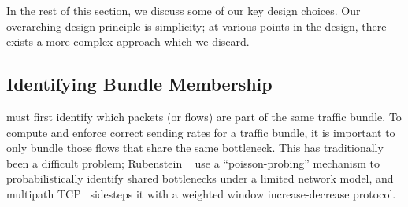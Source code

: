 

In the rest of this section, we discuss some of our key design choices.
Our overarching design principle is simplicity; at various points in the design, there exists a more complex approach which we discard.

\subsection{Identifying Bundle Membership}\label{s:design:membership}
\name must first identify which packets (or flows) are part of the same traffic bundle.
To compute and enforce correct sending rates for a traffic bundle, it is important to only bundle those flows that share the same bottleneck.
This has traditionally been a difficult problem; 
Rubenstein \etal~\cite{active-sharedbottlenecks} use a ``poisson-probing'' mechanism to probabilistically identify shared bottlenecks under a limited network model, and
multipath TCP~\cite{mptcp} sidesteps it with a weighted window increase-decrease protocol.


